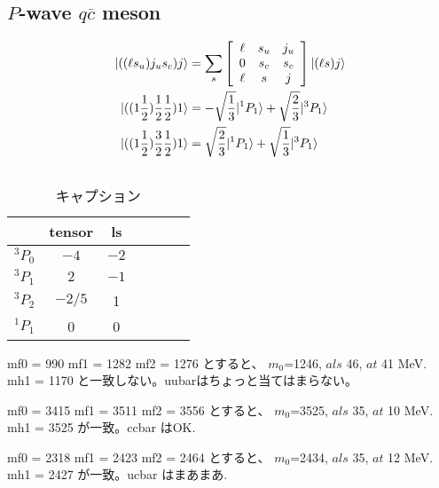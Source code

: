 \documentclass[a4j]{jarticle}
\def\ket{\rangle}
\def\cbar{\overline{{c}}}
\def\half#1{\text{${#1\over 2}$}}
\begin{document}
\subsection{$P$-wave $q\cbar$ meson}

\begin{align}
|((\ell s_u)j_us_c)j\ket&= 
\sum_s\left[\begin{array}{ccc}\ell &s_u& j_u\\0&s_c&s_c\\\ell&s&j\\\end{array}\right]|(\ell s)j\ket
\\
|((1\half1 )\half1\half1)1\ket&=-\sqrt{1\over 3}|^1P_1\ket +\sqrt{2\over 3}|^3P_1\ket
\\
|((1\half1 )\half3\half1)1\ket&= \sqrt{2\over 3}|^1P_1\ket +\sqrt{1\over 3}|^3P_1\ket
\end{align}
%
\begin{align}
\end{align}


\begin{table}[htbp]
\caption{キャプション}
\begin{center}
\begin{tabular}{c|cccccc}\hline
&tensor &ls\\\hline
$^3P_0$ & $-4$ & $-2$\\
$^3P_1$ & $2$ & $-1$\\
$^3P_2$ & $-2/5$ & 1\\
$^1P_1$ & 0 & 0\\\hline
\end{tabular}
\end{center}
\label{ラベル}
\end{table}%
mf0 = 990
mf1 = 1282
mf2 = 1276
とすると、
$m_0$=1246, $als$ 46, $at$ 41 MeV.
mh1 = 1170
と一致しない。uubarはちょっと当てはまらない。

mf0 = 3415
mf1 = 3511
mf2 = 3556
とすると、
$m_0$=3525, $als$ 35, $at$ 10 MeV.
mh1 = 3525
が一致。ccbar はOK.

mf0 = 2318
mf1 = 2423
mf2 = 2464
とすると、
$m_0$=2434, $als$ 35, $at$ 12 MeV.
mh1 = 2427
が一致。ucbar はまあまあ.
\end{document}
